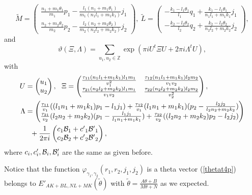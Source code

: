 \documentclass[12pt, a4paper]{article}
\newcommand{\Z}{{\mathbb Z}}
\begin{document}
%
\[  \tilde{M} = \begin{pmatrix}  \frac{n_1
+m_1 \theta_1}{m_1}p_1 - \frac{l_1(n_1 +m_1 \theta_1)}{m_1(n_1l_1
+m_1k_1)}j_1 \\
  \frac{n_2 +m_2 \theta_2}{m_2}p_2 -
\frac{l_2(n_2 +m_2 \theta_2)}{m_2(n_2l_2 +m_2k_2)}j_2
\end{pmatrix}   , \
    \tilde{L} = \begin{pmatrix} - \frac{k_1 -
l_1 \theta_1}{l_1}q_1 + \frac{k_1 -l_1 \theta_1}{n_1l_1
+m_1k_1}j_1 \\
 - \frac{k_2 -l_2 \theta_2}{l_2}q_2 +
\frac{k_2 -l_2 \theta_2}{n_2l_2 +m_2k_2}j_2
\end{pmatrix} ,
   \]
and
\[ \vartheta (\Xi,\Lambda) = \sum_{u_1, u_2 \in \Z} \exp ( \pi i U^t \Xi U
 + 2 \pi i {\Lambda}^t U ),  \]
with
\begin{align*}
 U & = \begin{pmatrix} u_1 \\ u_2 \end{pmatrix}  , \ \
        \Xi =   \begin{pmatrix} \frac{\tau_{11}  (n_1l_1
+m_1k_1)l_1 m_1}{v_1^2} & \frac{\tau_{12}  (n_1l_1 +m_1k_1)l_2
m_2}{v_1 v_2} \\
\frac{\tau_{21}  (n_2l_2 +m_2k_2)l_1 m_1}{v_1 v_2} &
\frac{\tau_{22} (n_2l_2 +m_2k_2)l_2 m_2}{v_2^2}
\end{pmatrix} , \\
%
  \Lambda & = \begin{pmatrix} \frac{ \tau_{11} }{v_1} ( (l_1n_1 +m_1k_1)
 p_1 - l_1 j_1) + \frac{ \tau_{12} }{v_1} ( l_1 n_1 +m_1k_1)
 ( p_2 -\frac{l_2 j_2}{l_2n_2 +m_2k_2} ) \\
%
 \frac{ \tau_{21} }{v_2}  ( l_2 n_2 +m_2k_2)
 ( p_1   -\frac{l_1 j_1}{l_1n_1 +m_1k_1} )
+ \frac{ \tau_{22} }{v_2} ( (l_2n_2 +m_2k_2)
 p_2 - l_2j_2)
 \end{pmatrix} \\
      &  \ \  +  \frac{1}{2 \pi i} \begin{pmatrix}
    c_1 {\cal B}_1 + {c'}_1 {\cal B'}_1 \\
    c_2 {\cal B}_2 + {c'}_2 {\cal B'}_2
  \end{pmatrix} ,
  \end{align*}
where $c_i, c_i' , {\cal B}_i, {\cal B}_i' $ are the same as given
before.

Notice that the function $\varphi_{\gamma_1,\gamma_2}
(r_1,r_2,j_1,j_2)$ is a theta vector (\ref{thetat4p}) belongs to $
{E'}_{AK+BL,NL+MK}(\tilde{\theta})$ with $\tilde{\theta} = \frac{A
\theta +B}{M\theta +N}$ as we expected.
\\
\end{document}
